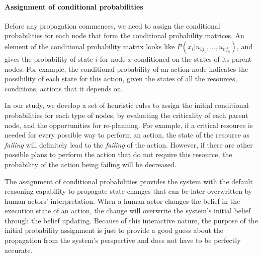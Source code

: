\paragraph*{Assignment of conditional probabilities} %
\label{par:assignment_of_conditional_probabilities}
Before any propagation commences, we need to assign the conditional probabilities for each node that form the conditional probability matrices. An element of the conditional probability matrix looks like $P(x_i|u_{1j_1}, ..., u_{nj_n})$, and gives the probability of state $i$ for node $x$ conditioned on the states of its parent nodes. For example, the conditional probability of an action node indicates the possibility of each state for this action, given the states of all the resources, conditions, actions that it depends on. 

In our study, we develop a set of heuristic rules to assign the initial conditional probabilities for each type of nodes, by evaluating the criticality of each parent node, and the opportunities for re-planning. For example, if a critical resource is needed for every possible way to perform an action, the state of the resource as \emph{failing} will definitely lead to the \emph{failing} of the action. However, if there are other possible plans to perform the action that do not require this resource, the probability of the action being failing will be decreased.

The assignment of conditional probabilities provides the system with the default reasoning capability to propagate state changes that can be later overwritten by human actors' interpretation. When a human actor changes the belief in the execution state of an action, the change will overwrite the system's initial belief through the belief updating. Because of this interactive nature, the purpose of the initial probability assignment is just to provide a good guess about the propagation from the system's perspective and does not have to be perfectly accurate. 

